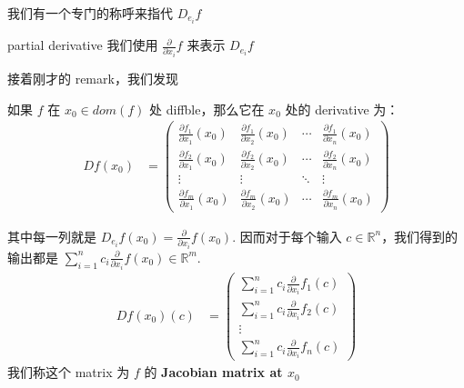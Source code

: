 \documentclass[lang=cn,11pt]{elegantbook}
\begin{document}
\noindent 我们有一个专门的称呼来指代 $D_{e_i} f$
\begin{definition}{partial derivative} \label{partial derivative}
    我们使用 $\frac{\partial }{ \partial x_i} f$ 来表示 $D_{e_i} f$
\end{definition}

接着刚才的 remark，我们发现
\begin{theorem}
    如果 $f $ 在 $x_0 \in dom(f) $ 处 diffble，那么它在 $x_0$ 处的 derivative 为：
    \begin{align}
        Df(x_0) 
        & = \begin{pmatrix}
        \frac{\partial f_1}{\partial x_1} (x_0)& \frac{\partial f_1}{\partial x_2}(x_0) & \cdots & \frac{\partial f_1}{\partial x_n}(x_0) \\
        \frac{\partial f_2}{\partial x_1} (x_0)& \frac{\partial f_2}{\partial x_2}(x_0) & \cdots & \frac{\partial f_2}{\partial x_n}(x_0) \\
        \vdots & \vdots & \ddots & \vdots \\
        \frac{\partial f_m}{\partial x_1}(x_0) & \frac{\partial f_m}{\partial x_2} (x_0)& \cdots & \frac{\partial f_m}{\partial x_n}(x_0)
        \end{pmatrix}
    \end{align}

    其中每一列就是 $D_{e_i} f(x_0) = \frac{\partial}{\partial x_i} f(x_0)$. 因而对于每个输入 $ c \in \mathbb{R}^n$，我们得到的输出都是 $\sum_{i=1}^n c_i \frac{\partial}{\partial x_i} f(x_0) \in \mathbb{R}^m$.\\
    
    \begin{align}
        Df(x_0) (c)
        & = \begin{pmatrix}
        \sum_{i=1}^n c_i \frac{\partial}{\partial x_i} f_1(c) \\
        \sum_{i=1}^n c_i \frac{\partial}{\partial x_i} f_2(c) \\
        \vdots  \\
        \sum_{i=1}^n c_i \frac{\partial}{\partial x_i} f_n(c)
        \end{pmatrix}
    \end{align}
我们称这个 matrix 为 $f$ 的 \textbf{Jacobian matrix at $x_0$}
\end{theorem}
\end{document}
